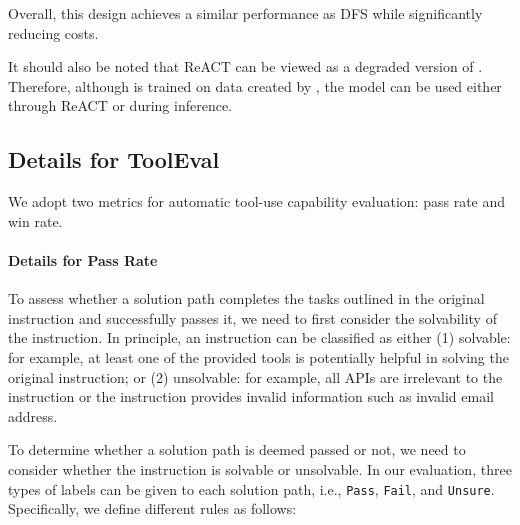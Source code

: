 Overall, this design achieves a similar performance as DFS while significantly reducing costs.

It should also be noted that ReACT can be viewed as a degraded version of \dfs. Therefore, although \ourmodel is trained on data created by \dfs, the model can be used either through ReACT or \dfs during inference.

\subsection{Details for ToolEval}
\label{sec:details_tooleval}

We adopt two metrics for automatic tool-use capability evaluation: pass rate and win rate.

\paragraph{Details for Pass Rate}
To assess whether a solution path completes the tasks outlined in the original instruction and successfully passes it, we need to first consider the solvability of the instruction. In principle, an instruction can be classified as either (1) solvable: for example, at least one of the provided tools is potentially helpful in solving the original instruction; or (2) unsolvable: for example, all APIs are irrelevant to the instruction or the instruction provides invalid information such as invalid email address.

To determine whether a solution path is deemed passed or not, we need to consider whether the instruction is solvable or unsolvable. In our evaluation, three types of labels can be given to each solution path, i.e., \texttt{Pass}, \texttt{Fail}, and \texttt{Unsure}. Specifically, we define different rules as follows:

